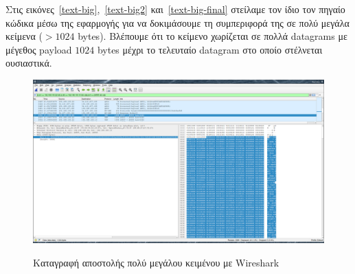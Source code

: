 \documentclass{article}
\begin{document}
Στις εικόνες~\ref{text-big},~\ref{text-big2} και~\ref{text-big-final} στείλαμε τον ίδιο 
τον πηγαίο κώδικα μέσω της εφαρμογής για να 
δοκιμάσουμε τη συμπεριφορά της σε πολύ μεγάλα κείμενα ($> 1024$ bytes). Βλέπουμε ότι το 
κείμενο χωρίζεται σε πολλά datagrams με μέγεθος payload $1024$ bytes μέχρι το τελευταίο
datagram στο οποίο στέλνεται ουσιαστικά.

\begin{figure}%
    \centering
        {\includegraphics[scale=0.1]{textbigsend}}
        \caption{Καταγραφή αποστολής πολύ μεγάλου κειμένου με Wireshark}
\end{figure}
\end{document}
